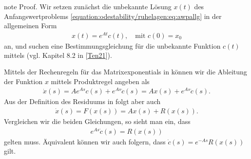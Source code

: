 \documentclass[letterpaper,10pt,german]{jupyterBook}
\begin{document}
\begin{sphinxadmonition}{note}
\sphinxAtStartPar
Proof. Wir setzen zunächst die unbekannte Lösung \(x(t)\) des Anfangswertproblems \eqref{equation:odestability/ruhelagen:eq:awpallg} in der allgemeinen Form
\begin{equation*}
\begin{split}x(t) = e^{At}c(t),\quad \text{mit }c(0) = x_0\end{split}
\end{equation*}
\sphinxAtStartPar
an, und suchen eine Bestimmungsgleichung für die unbekannte Funktion \(c(t)\) mittels  (vgl. Kapitel 8.2 in {[}\hyperlink{cite.references:id15}{Ten21}{]}).

\sphinxAtStartPar
Mittels der Rechenregeln für das Matrixexponentials in {\hyperref[\detokenize{ode/repetition:rem:matrixexponentialregeln}]{}} können wir die Ableitung der Funktion \(x\) mittels Produktregel angeben als
\begin{equation*}
\begin{split}\dot{x}(s) = A e^{As}c(s)+ e^{As}\dot{c}(s) = Ax(s) + e^{As}\dot{c}(s).\end{split}
\end{equation*}
\sphinxAtStartPar
Aus der Definition des Residuums in {\hyperref[\detokenize{odestability/ruhelagen:def:linearisierung}]{}} folgt aber auch
\begin{equation*}
\begin{split}\dot{x}(s) = F(x(s)) = Ax(s) + R(x(s)).\end{split}
\end{equation*}
\sphinxAtStartPar
Vergleichen wir die beiden Gleichungen, so sieht man ein, dass
\begin{equation*}
\begin{split}e^{As}\dot{c}(s) = R(x(s))\end{split}
\end{equation*}
\sphinxAtStartPar
gelten muss.
Äquivalent können wir auch folgern, dass \(\dot{c}(s) = e^{-As}R(x(s))\) gilt.


\end{sphinxadmonition}
\end{document}
